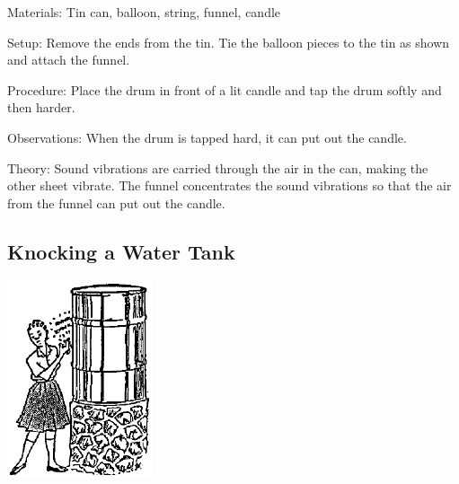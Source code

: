 \begin{multicols}{2}
\begin{description*}
\item[Materials:]{Tin can, balloon, string, funnel, candle}
\item[Setup:]{Remove the ends from the tin. Tie the balloon pieces to the tin as shown and attach the funnel.}
\item[Procedure:]{Place the drum in front of a lit candle and tap the drum softly and then harder.}
\item[Observations:]{When the drum is tapped hard, it can put out the candle.}
\item[Theory:]{Sound vibrations are carried through the air in the can, making the other sheet vibrate. The funnel concentrates the sound vibrations so that the air from the funnel can put out the candle.}
\end{description*}

\subsection{Knocking a Water Tank}

\begin{center}
\includegraphics[width=0.32\textwidth]{./img/source/knocking-water-tank.png}
\end{center}


\end{multicols}
